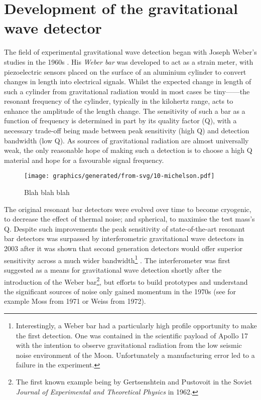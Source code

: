 \section{Development of the gravitational wave detector}
The field of experimental gravitational wave detection began with Joseph Weber's studies in the 1960s \cite{Weber1960}. His \emph{Weber bar} was developed to act as a strain meter, with piezoelectric sensors placed on the surface of an aluminium cylinder to convert changes in length into electrical signals. Whilst the expected change in length of such a cylinder from gravitational radiation would in most cases be tiny------the resonant frequency of the cylinder, typically in the kilohertz range, acts to enhance the amplitude of the length change. The sensitivity of such a bar as a function of frequency is determined in part by its quality factor (Q), with a necessary trade-off being made between peak sensitivity (high Q) and detection bandwidth (low Q). As sources of gravitational radiation are almost universally weak, the only reasonable hope of making such a detection is to choose a high Q material and hope for a favourable signal frequency.

\begin{figure}
  \centering
  \texttt{[image: graphics/generated/from-svg/10-michelson.pdf]}
  \caption[]{Blah blah blah}
\end{figure}

The original resonant bar detectors were evolved over time to become cryogenic, to decrease the effect of thermal noise; and spherical, to maximise the test mass's Q. Despite such improvements the peak sensitivity of state-of-the-art resonant bar detectors was surpassed by interferometric gravitational wave detectors in 2003 \cite{Pitkin2011} after it was shown that second generation detectors would offer superior sensitivity across a much wider bandwidth\footnote{Interestingly, a Weber bar had a particularly high profile opportunity to make the first detection. One was contained in the scientific payload of Apollo 17 with the intention to observe gravitational radiation from the low seismic noise environment of the Moon. Unfortunately a manufacturing error led to a failure in the experiment.} \cite{Harry2002a}. The interferometer was first suggested as a means for gravitational wave detection shortly after the introduction of the Weber bar\footnote{The first known example being by Gertsenshtein and Pustovoit in the Soviet \emph{Journal of Experimental and Theoretical Physics} in 1962.}, but efforts to build prototypes and understand the significant sources of noise only gained momentum in the 1970s (see for example Moss \etal \cite{Moss1971} from 1971 or Weiss \cite{Weiss1972} from 1972).

